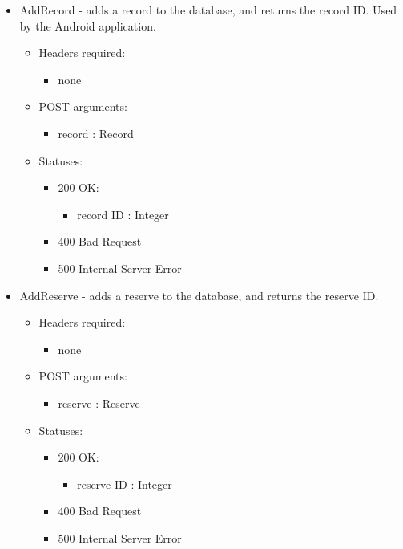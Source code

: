 \begin{itemize}
        \item AddRecord - adds a record to the database, and returns the record ID. Used by the Android application.
        \begin{itemize}
        	\item Headers required:
        	\begin{itemize}
          	  \item none
        	\end{itemize}
        	\item POST arguments:
        	\begin{itemize}
        	    \item record : Record
        	\end{itemize}
        	\item Statuses:
        	\begin{itemize}
        		\item 200 OK:
           	 	\begin{itemize}
        			\item record ID : Integer
           	 	\end{itemize}
        		\item 400 Bad Request
        		\item 500 Internal Server Error
       		 \end{itemize}
	\end{itemize}

        \item AddReserve - adds a reserve to the database, and returns the reserve ID.
        \begin{itemize}
        \item Headers required:
        \begin{itemize}
            \item none
        \end{itemize}
        \item POST arguments:
        \begin{itemize}
            \item reserve : Reserve
        \end{itemize}
        \item Statuses:
        \begin{itemize}
        	\item 200 OK:
            \begin{itemize}
        		\item reserve ID : Integer
            \end{itemize}
        	\item 400 Bad Request
        	\item 500 Internal Server Error
        \end{itemize}
	 \end{itemize}
    


\end{itemize}

